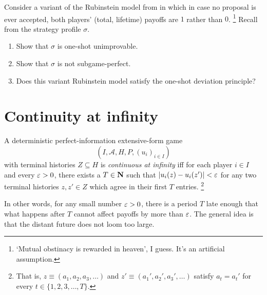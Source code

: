 \begin{exercise}
	\label{exercise:rubinstein_non-osdp}
	Consider a variant of the Rubinstein model from  in which in case no proposal is ever accepted, both players' (total, lifetime) payoffs are $1$ rather than $0$.%
		\footnote{`Mutual obstinacy is rewarded in heaven', I guess. It's an artificial assumption.}
	Recall from  the strategy profile $\sigma$.

	\begin{enumerate}[label=(\alph*)]

		\item Show that $\sigma$ is one-shot unimprovable.

		\item Show that $\sigma$ is not subgame-perfect.

		\item Does this variant Rubinstein model satisfy the one-shot deviation principle?
	
	\end{enumerate}
\end{exercise}



\section{Continuity at infinity}
\label{osdp:valid}

\begin{definition}
	\label{definition:conts_at_infty}
	A deterministic perfect-information extensive-form game
	\begin{equation*}
		(I,\mathcal{A},H,P,(u_i)_{i \in I}) 
	\end{equation*}
	with terminal histories $Z \subseteq H$ is \emph{continuous at infinity} iff for each player $i \in I$ and every $\varepsilon>0$, there exists a $T \in \mathbf{N}$ such that $\abs*{ u_i(z) - u_i(z') } < \eps$ for any two terminal histories $z,z' \in Z$ which agree in their first $T$ entries.%
		\footnote{That is, $z \equiv (a_1,a_2,a_3,\dots)$ and $z' \equiv (a_1',a_2',a_3',\dots)$ satisfy $a_t=a_t'$ for every $t \in \{1,2,3,\dots,T\}$.}
\end{definition}

In other words, for any small number $\varepsilon>0$, there is a period $T$ late enough that what happens after $T$ cannot affect payoffs by more than $\varepsilon$. The general idea is that the distant future does not loom too large.

